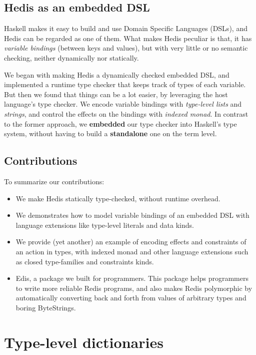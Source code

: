 \documentclass[pldi]{sigplanconf-pldi16}
\begin{document}
\subsection{Hedis as an embedded DSL}

Haskell makes it easy to build and use Domain Specific Languages (DSLs),
 and Hedis can be regarded as one of them. What makes Hedis peculiar is that,
 it has \emph{variable bindings} (between keys and values), but with very
 little or no semantic checking, neither dynamically nor statically.

We began with making Hedis a dynamically checked embedded DSL, and implemented a
 runtime type checker that keeps track of types of each variable. But then we
 found that things can be a lot easier, by leveraging the host language's type
 checker. We encode variable bindings with \emph{type-level lists} and
 \emph{strings}, and control the effects on the bindings with
 \emph{indexed monad}. In contrast to the former approach, we \textbf{embedded}
 our type checker into Haskell's type system, without having to build a
 \textbf{standalone} one on the term level.

\subsection{Contributions}

To summarize our contributions:

\begin{itemize}[noitemsep]
\item We make Hedis statically type-checked, without runtime overhead.
\item We demonstrates how to model variable bindings of an embedded DSL with
 language extensions like type-level literals and data kinds.
\item We provide (yet another) an example of encoding effects and constraints of
 an action in types, with indexed monad\cite{indexedmonad} and other language
 extensions such as closed type-families\cite{closedtypefamilies} and
 constraints kinds\cite{constraintskinds}.
\item Edis, a package we built for programmers. This package helps programmers
 to write more reliable Redis programs, and also makes Redis polymorphic by
 automatically converting back and forth from values of arbitrary types and
 boring ByteStrings.
\end{itemize}

\section{Type-level dictionaries}
\end{document}
